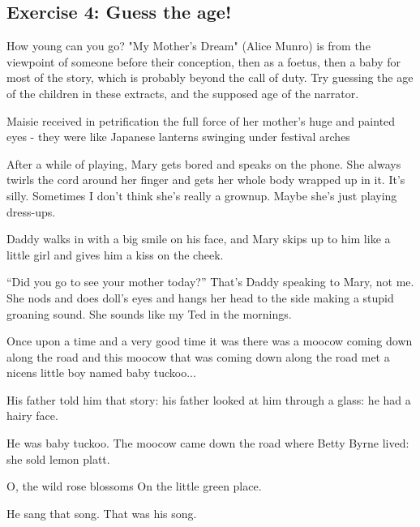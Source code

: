 \documentclass[11pt]{article}
\newenvironment{narrow}[2]{%
 \begin{list}{}{%
  \setlength{\topsep}{0pt}%
  \setlength{\leftmargin}{#1}%
  \setlength{\rightmargin}{#2}%
  \setlength{\listparindent}{\parindent}%
  \setlength{\itemindent}{\parindent}%
  \setlength{\parsep}{\parskip}%
 }%
\item[]}{\end{list}}
\begin{document}
\subsection*{Exercise 4: Guess the age!}
How young can you go? "My Mother's Dream" (Alice Munro) is from the viewpoint of someone before their conception, then as a foetus, then a baby for most of the story, which is probably beyond the call of duty. Try guessing the age of the children in these extracts, and the supposed age of the narrator.
\begin{itemize}
\item 
\begin{narrow}{1.0cm}{1.0cm}
Maisie received in petrification the full force of her mother's
 huge and painted eyes - they were like Japanese lanterns swinging under festival arches
\end{narrow}


\item 
\begin{narrow}{1.0cm}{1.0cm}
After a while of playing, Mary gets bored and speaks on the phone. She always 
twirls the cord around her finger and gets her whole body wrapped up in it. 
It’s silly. Sometimes I don’t think she’s really a grownup. Maybe she’s just 
playing dress-ups.

Daddy walks in with a big smile on his face, and Mary skips up to him like a 
little girl and gives him a kiss on the cheek.

“Did you go to see your mother today?” That’s Daddy speaking to Mary, not me. 
She nods and does doll’s eyes and hangs her head to the side making a stupid 
groaning sound. She sounds like my Ted in the mornings. 
\end{narrow}



\item 
\begin{narrow}{1.0cm}{1.0cm}
Once upon a time and a very good time it was there was a moocow coming
down along the road and this moocow that was coming down along the road
met a nicens little boy named baby tuckoo...

His father told him that story: his father looked at him through a
glass: he had a hairy face.

He was baby tuckoo. The moocow came down the road where Betty Byrne
lived: she sold lemon platt.

    O, the wild rose blossoms
    On the little green place.

He sang that song. That was his song.


\end{narrow}
\end{itemize}
\end{document}
